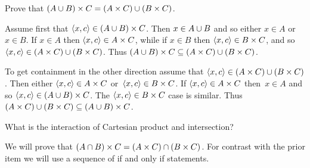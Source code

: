 \documentclass{test}  %
\begin{document}
\begin{problem} 
\begin{exes}
\begin{exercise}
  Prove that $(A\cup B)\times C=(A\times C)\cup(B\times C)$.
\end{exercise}
\begin{answer}
  Assume first that $\langle x,c\rangle\in (A\cup B)\times C$.
  Then $x\in A\cup B$ and so either $x\in A$ or~$x\in B$.
  If $x\in A$ then $\langle x,c\rangle\in A\times C$, while 
  if $x\in B$ then $\langle x,c\rangle\in B\times C$, and so 
  $\langle x,c\rangle\in (A\times C)\cup (B\times C)$.
  Thus $(A\cup B)\times C\subseteq (A\times C)\cup (B\times C)$.
  
  To get containment in the other direction assume that 
  $\langle x,c\rangle\in (A\times C)\cup (B\times C)$.
  Then either $\langle x,c\rangle\in A\times C$ or~$\langle x,c\rangle\in B\times C$.
  If $\langle x,c\rangle\in A\times C$ then~$x\in A$ and so 
  $\langle x,c\rangle\in (A\cup B)\times C$.
  The  $\langle x,c\rangle\in B\times C$ case is similar.
  Thus $(A\times C)\cup (B\times C)\subseteq (A\cup B)\times C$.   
\end{answer}
\begin{exercise}
  What is the interaction of Cartesian product and intersection?
\end{exercise}
\begin{answer}
\item We will prove that 
  $(A\cap B)\times C = (A\times C)\cap (B\times C)$.
  For contrast with the prior item
  we will use a sequence of if and only if statements.


\end{answer}
\end{exes}
\end{problem}
\end{document}
